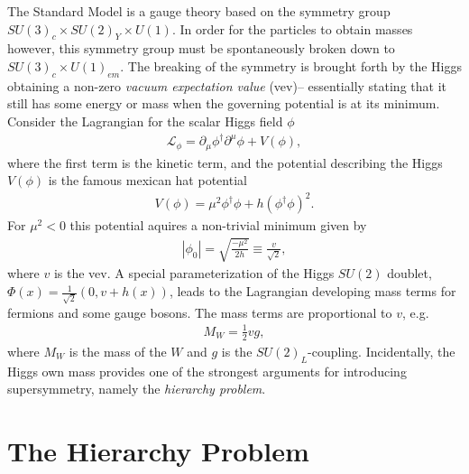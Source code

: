 \documentclass[twoside,english]{uiofysmaster}
\begin{document}
The Standard Model is a gauge theory based on the symmetry group $SU(3)_c \times SU(2)_Y \times U(1)$. In order for the particles to obtain masses however, this symmetry group must be spontaneously broken down to $SU(3)_c \times U(1)_{em}$. The breaking of the symmetry is brought forth by the Higgs obtaining a non-zero \textit{vacuum expectation value} (vev)-- essentially stating that it still has some energy or mass when the governing potential is at its minimum. Consider the Lagrangian for the scalar Higgs field $\phi$
\begin{align}
\mathcal{L}_{\phi} = \partial_{\mu} \phi^{\dagger} \partial^{\mu} \phi + V(\phi),
\end{align}
where the first term is the kinetic term, and the potential describing the Higgs $V(\phi)$ is the famous mexican hat potential
\begin{align}
V(\phi) = \mu^2 \phi^{\dagger} \phi + h (\phi^{\dagger} \phi)^2.
\end{align}
For $\mu^2 < 0$ this potential aquires a non-trivial minimum given by
\begin{align}
|\phi_0| = \sqrt{\frac{-\mu^2}{2h}} \equiv \frac{v}{\sqrt{2}},
\end{align}
where $v$ is the vev. A special parameterization of the Higgs $SU(2)$ doublet, $\Phi(x) = \frac{1}{\sqrt{2}} (0, v + h(x))$, leads to the Lagrangian developing mass terms for fermions and some gauge bosons. The mass terms are proportional to $v$, e.g.
\begin{align*}
M_W = \frac{1}{2} v g,
\end{align*}
where $M_W$ is the mass of the $W$ and $g$ is the $SU(2)_L$-coupling. Incidentally, the Higgs own mass provides one of the strongest arguments for introducing supersymmetry, namely the \textit{hierarchy problem}.

\section{The Hierarchy Problem}
\end{document}
